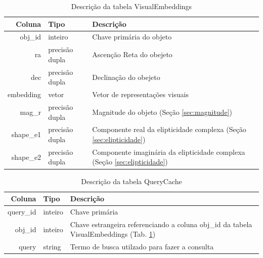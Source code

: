 \begin{table}[!ht]
  \centering
  \caption{Descrição da tabela VisualEmbeddings}
  \label{tab:VisualEmbeddings}
  \begin{tabular}{rlp{.6\linewidth}}
    \toprule
    Coluna    & Tipo           & Descrição                                                                     \\
    \midrule
    obj\_id   & inteiro        & Chave primária do objeto                                                      \\
    ra        & precisão dupla & Ascenção Reta do obejeto                                                      \\
    dec       & precisão dupla & Declinação do obejeto                                                         \\
    embedding & vetor          & Vetor de representações visuais                                               \\
    mag\_r    & precisão dupla & Magnitude do objeto (Seção \ref{sec:magnitude})                               \\
    shape\_e1 & precisão dupla & Componente real da elipticidade complexa (Seção \ref{sec:elipticidade})       \\
    shape\_e2 & precisão dupla & Componente imaginária da elipticidade complexa (Seção \ref{sec:elipticidade}) \\
    \bottomrule
  \end{tabular}
\end{table}


\begin{table}[!ht]
  \centering
  \caption{Descrição da tabela QueryCache}
  \label{tab:QueryCache}
  \begin{tabular}{rlp{.6\linewidth}}
    \toprule
    Coluna    & Tipo    & Descrição                                                                                                     \\
    \midrule
    query\_id & inteiro & Chave primária                                                                                                \\
    obj\_id   & inteiro & Chave estrangeira referenciando a coluna obj\_id da tabela VisualEmbeddings (Tab. \ref{tab:VisualEmbeddings}) \\
    query     & string  & Termo de busca utilzado para fazer a consulta                                                                 \\
    \bottomrule
  \end{tabular}
\end{table}



